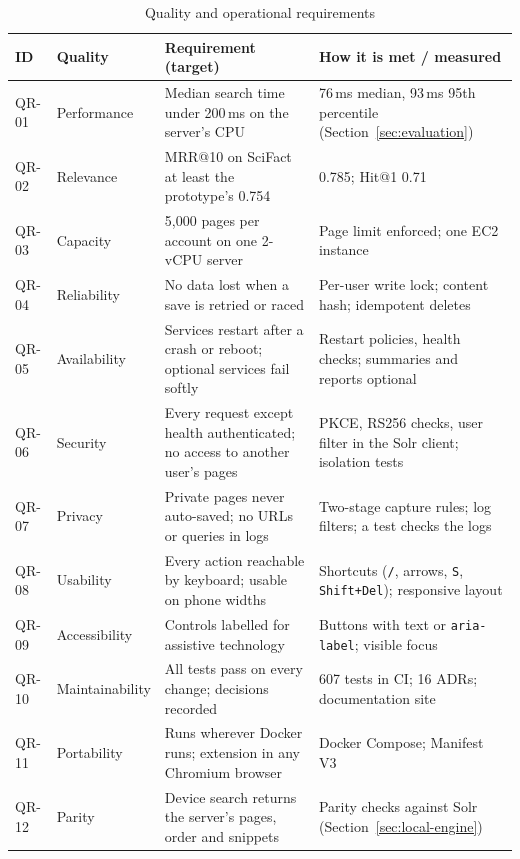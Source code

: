 \begin{table}[H]
\centering
\footnotesize
\begin{tabularx}{\textwidth}{>{\ttfamily}p{} >{\raggedright\arraybackslash}p{} L L}
\toprule
\textrm{\textbf{ID}} & \textbf{Quality} & \textbf{Requirement (target)} & \textbf{How it is met / measured} \\
\midrule
QR-01 & Performance & Median search time under 200\,ms on the server's CPU & 76\,ms median, 93\,ms 95th percentile (Section~\ref{sec:evaluation}) \\
QR-02 & Relevance & MRR@10 on SciFact at least the prototype's 0.754 & 0.785; Hit@1 0.71 \\
QR-03 & Capacity & 5{,}000 pages per account on one 2-vCPU server & Page limit enforced; one EC2 instance \\
QR-04 & Reliability & No data lost when a save is retried or raced & Per-user write lock; content hash; idempotent deletes \\
QR-05 & Availability & Services restart after a crash or reboot; optional services fail softly & Restart policies, health checks; summaries and reports optional \\
QR-06 & Security & Every request except health authenticated; no access to another user's pages & PKCE, RS256 checks, user filter in the Solr client; isolation tests \\
QR-07 & Privacy & Private pages never auto-saved; no URLs or queries in logs & Two-stage capture rules; log filters; a test checks the logs \\
QR-08 & Usability & Every action reachable by keyboard; usable on phone widths & Shortcuts (\texttt{/}, arrows, \texttt{S}, \texttt{Shift+Del}); responsive layout \\
QR-09 & Accessibility & Controls labelled for assistive technology & Buttons with text or \texttt{aria-label}; visible focus \\
QR-10 & Maintainability & All tests pass on every change; decisions recorded & 607 tests in CI; 16 ADRs; documentation site \\
QR-11 & Portability & Runs wherever Docker runs; extension in any Chromium browser & Docker Compose; Manifest V3 \\
QR-12 & Parity & Device search returns the server's pages, order and snippets & Parity checks against Solr (Section~\ref{sec:local-engine}) \\
\bottomrule
\end{tabularx}
\caption{Quality and operational requirements}
\label{tab:nfr}
\end{table}

